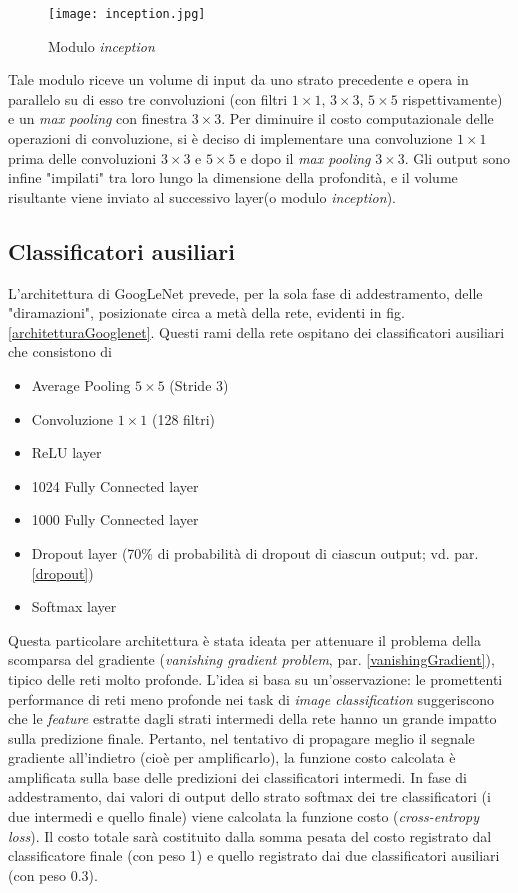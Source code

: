 \begin{figure}[h] 
\centering
\texttt{[image: inception.jpg]}
\caption{Modulo \textit{inception}}
\label{fig:inception}
\end{figure}

Tale modulo riceve un volume di input da uno strato precedente e opera in parallelo su di esso tre convoluzioni (con filtri $1\times 1$, $3\times 3$, $5\times 5$ rispettivamente) e un \textit{max pooling} con finestra $3\times 3$. Per diminuire il costo computazionale delle operazioni di convoluzione, si è deciso di implementare una convoluzione $1\times 1$ prima delle convoluzioni $3\times 3$ e $5\times 5$ e dopo il \textit{max pooling} $3\times 3$.
Gli output sono infine "impilati" tra loro lungo la dimensione della profondità, e il volume risultante viene inviato al successivo layer(o modulo \textit{inception}).

\subsection{Classificatori ausiliari}
\label{classificatoriAusiliari}
L'architettura di GoogLeNet prevede, per la sola fase di addestramento, delle "diramazioni", posizionate circa a metà della rete, evidenti in fig. \ref{architetturaGooglenet}.
Questi rami della rete ospitano dei classificatori ausiliari che consistono di
\begin{itemize}
\item Average Pooling $5\times 5$ (Stride 3)
\item Convoluzione $1\times 1$ (128 filtri)
\item ReLU layer
\item 1024 Fully Connected layer
\item 1000 Fully Connected layer
\item Dropout layer (70\% di probabilità di dropout di ciascun output; vd. par. \ref{dropout})
\item Softmax layer
\end{itemize}
Questa particolare architettura è stata ideata per attenuare il problema della scomparsa del gradiente (\textit{vanishing gradient problem}, par. \ref{vanishingGradient}), tipico delle reti molto profonde. L'idea si basa su un'osservazione: le promettenti performance di reti meno profonde nei task di \textit{image classification} suggeriscono che le \textit{feature} estratte dagli strati intermedi della rete hanno un grande impatto sulla predizione finale. Pertanto, nel tentativo di propagare meglio il segnale gradiente all'indietro (cioè per amplificarlo), la funzione costo calcolata è amplificata sulla base delle predizioni dei classificatori intermedi.
In fase di addestramento, dai valori di output dello strato softmax dei tre classificatori (i due intermedi e quello finale) viene calcolata la funzione costo (\textit{cross-entropy loss}). 
Il costo totale sarà costituito dalla somma pesata del costo registrato dal classificatore finale (con peso 1) e quello registrato dai due classificatori ausiliari (con peso $0.3$).

